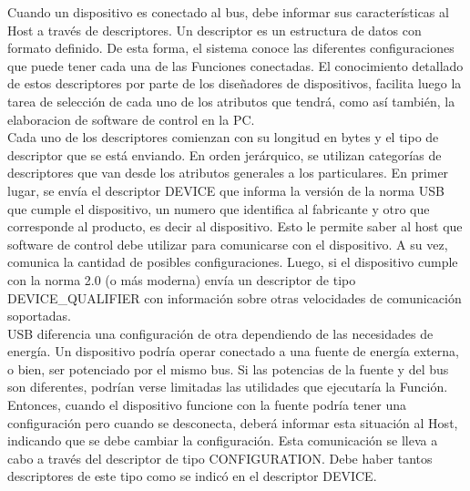 %

Cuando un dispositivo es conectado al bus, debe informar sus características al Host a través de descriptores. Un descriptor es un estructura de datos con formato definido. De esta forma, el sistema conoce las diferentes configuraciones que puede tener cada una de las Funciones conectadas. El conocimiento detallado de estos descriptores por parte de los diseñadores de dispositivos, facilita luego la tarea de selección de cada uno de los atributos que tendrá, como así también, la elaboracion de software de control en la PC.\\

Cada uno de los descriptores comienzan con su longitud en bytes y el tipo de descriptor que se está enviando. En orden jerárquico, se utilizan categorías de descriptores que van desde los atributos generales a los particulares. En primer lugar, se envía el descriptor DEVICE que informa la versión de la norma USB que cumple el dispositivo, un numero que identifica al fabricante y otro que corresponde al producto, es decir al dispositivo. Esto le permite saber al host que software de control debe utilizar para comunicarse con el dispositivo. A su vez, comunica la cantidad de posibles configuraciones. Luego, si el dispositivo cumple con la norma 2.0 (o más moderna) envía un descriptor de tipo DEVICE\_QUALIFIER con información sobre otras velocidades de comunicación soportadas.\\

USB diferencia una configuración de otra dependiendo de las necesidades de energía. Un dispositivo podría operar conectado a una fuente de energía externa, o bien, ser potenciado por el mismo bus. Si las potencias de la fuente y del bus son diferentes, podrían verse limitadas las utilidades que ejecutaría la Función. Entonces, cuando el dispositivo funcione con la fuente podría tener una configuración pero cuando se desconecta, deberá informar esta situación al Host, indicando que se debe cambiar la configuración. Esta comunicación se lleva a cabo a través del descriptor de tipo CONFIGURATION. Debe haber tantos descriptores de este tipo como se indicó en el descriptor DEVICE.\\


